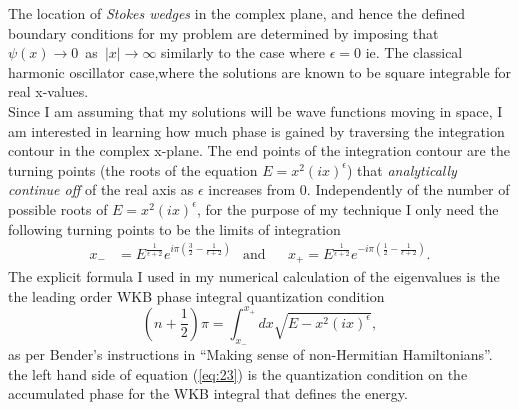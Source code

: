\documentclass[10pt, a4paper, singlespacing, headsepline]{report}
\begin{document}
The location of \emph{Stokes wedges} in the complex plane, and hence the defined boundary conditions for my problem are determined by imposing that \mbox{$\psi(x) \rightarrow 0$ as $|x| \rightarrow \infty$} similarly to the case where $\epsilon = 0$ ie. The classical harmonic oscillator case,where the solutions are known to be square integrable for real x-values.\\
Since I am assuming that my solutions will be wave functions moving in space, I am interested in learning how much phase is gained by traversing the integration contour in the complex x-plane. The end points of the integration contour are the turning points (the roots of the equation $E = x^2(ix)^{\epsilon}$) that \emph{analytically continue off} of the real axis as $\epsilon$ increases from $0$\cite{BenderPT}\cite{Bender}. Independently of the number of possible roots of $E = x^2(ix)^{\epsilon}$, for the purpose of my technique I only need the following turning points to be the limits of integration
\begin{align} \label{eq:22}
x_{-}& = 
E^{\frac{1}{\epsilon + 2}}
e^{i\pi(\frac{3}{2} - \frac{1}{\epsilon + 2})}
&\mathrm{and}&
&x_{+} = E^{\frac{1}{\epsilon + 2}} e^{-i\pi(\frac{1}{2} - \frac{1}{\epsilon + 2})}.
\end{align}
The explicit formula I used in my numerical calculation of the eigenvalues is the the leading order WKB phase integral quantization condition 
\begin{equation} \label{eq:23}
\left (n +\frac{1}{2}\right )\pi = \int^{x_{+}}_{x_{-}}dx \sqrt{E - x^2(ix)^{\epsilon}},
\end{equation}
as per Bender's instructions in ``Making sense of non-Hermitian Hamiltonians''. the left hand side of equation (\ref{eq:23}) is the quantization condition on the accumulated phase for the WKB integral that defines the energy.\\
\end{document}
